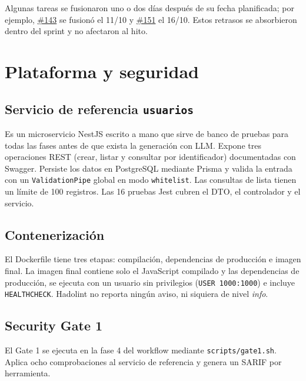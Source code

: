 \documentclass[11pt,a4paper]{report}
\newcommand{\pr}[1]{\href{https://github.com/PracticasESPE/Framework_Desarrollo_Seguro/pull/#1}{\##1}}
\begin{document}
Algunas tareas se fusionaron uno o dos días después de su fecha planificada; por ejemplo,
\pr{143} se fusionó el 11/10 y \pr{151} el 16/10. Estos retrasos se absorbieron dentro del
sprint y no afectaron al hito.

\section{Plataforma y seguridad}

\subsection{Servicio de referencia \texttt{usuarios}}
Es un microservicio NestJS escrito a mano que sirve de banco de pruebas para todas las fases
antes de que exista la generación con LLM. Expone tres operaciones REST (crear, listar y
consultar por identificador) documentadas con Swagger. Persiste los datos en PostgreSQL mediante
Prisma y valida la entrada con un \texttt{ValidationPipe} global en modo \texttt{whitelist}. Las
consultas de lista tienen un límite de 100 registros. Las 16 pruebas Jest cubren el DTO, el
controlador y el servicio.

\subsection{Contenerización}
El Dockerfile tiene tres etapas: compilación, dependencias de producción e imagen final. La imagen
final contiene solo el JavaScript compilado y las dependencias de producción, se ejecuta con un
usuario sin privilegios (\texttt{USER 1000:1000}) e incluye \texttt{HEALTHCHECK}. Hadolint no
reporta ningún aviso, ni siquiera de nivel \emph{info}.

\subsection{Security Gate 1}
El Gate 1 se ejecuta en la fase 4 del workflow mediante \texttt{scripts/gate1.sh}. Aplica ocho
comprobaciones al servicio de referencia y genera un SARIF por herramienta.
\end{document}
